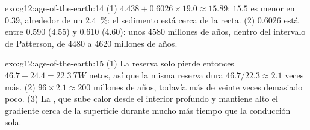 \begin{solution}{exo:g12:age-of-the-earth:14}
(1) $4.438 + 0.6026 \times 19.0 \approx 15.89$; $15.5$ es menor en $0.39$,
alrededor de un \qty{2.4}{\percent}: el sedimento está cerca de la recta.
(2) 0.6026 está entre 0.590 (4.55) y 0.610 (4.60): unos 4580 millones de
años, dentro del intervalo de Patterson, de 4480 a 4620 millones de años.
\end{solution}

\begin{solution}{exo:g12:age-of-the-earth:15}
(1) La reserva solo pierde entonces $46.7 - 24.4 = \qty{22.3}{TW}$ netos, así
que la misma reserva dura $46.7/22.3 \approx 2.1$ veces más. (2) $96 \times 2.1 \approx
200$ millones de años, todavía más de veinte veces demasiado poco.
(3) La , que sube calor desde el interior profundo y
mantiene alto el gradiente cerca de la superficie durante mucho más tiempo que
la conducción sola.
\end{solution}

